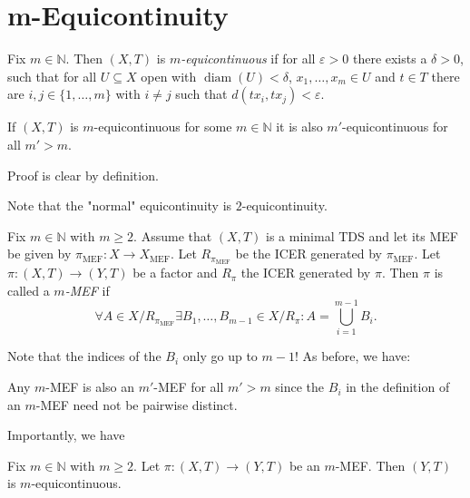 \section{m-Equicontinuity}

\begin{frame}
    \begin{definition}
	    Fix $m \in \mathbb{N}$. Then $(X, T)$ is \emph{$m$-equicontinuous} if for all $\varepsilon > 0$ there exists a $\delta > 0$, such that for all $U \subseteq X$ open with $\operatorname{diam}(U) < \delta$, $x_1, \dots, x_m \in U$ and $t \in T$ there are $i, j \in \{1, \dots, m\}$ with $i \neq j$ such that $d(tx_i, tx_j) < \varepsilon$.
    \end{definition}
    \pause
    \begin{proposition}
	    If $(X, T)$ is $m$-equicontinuous for some $m \in \mathbb{N}$ it is also $m'$-equicontinuous for all $m' > m$.
    \end{proposition}
    Proof is clear by definition.

    Note that the "normal" equicontinuity is $2$-equicontinuity.
\end{frame}

\begin{frame}
    \begin{definition}[$m$-MEF]
        Fix $m \in \mathbb{N}$ with $m \geq 2$. Assume that $(X, T)$ is a minimal TDS and let its MEF be given by $\pi_{\mathrm{MEF}}: X \to X_{\mathrm{MEF}}$.
        Let $R_{\pi_{\mathrm{MEF}}}$ be the ICER generated by $\pi_{\text{MEF}}$. Let $\pi: (X,T) \to (Y,T)$ be a factor and $R_\pi$ the ICER generated by $\pi$.
        Then $\pi$ is called a \emph{$m$-MEF} if
        \begin{equation*}
            \forall A \in X/R_{\pi_{\mathrm{MEF}}} \exists B_1, \dots, B_{m-1} \in X/R_\pi: 
            A = \bigcup_{i=1}^{m-1} B_i.
        \end{equation*}
    \end{definition}
    Note that the indices of the $B_i$ only go up to $m-1$!
    \pause
    As before, we have:
    \begin{remark}
        Any $m$-MEF is also an $m'$-MEF for all $m' > m$
        since the $B_i$ in the definition of an $m$-MEF need not be pairwise distinct.
    \end{remark}
\end{frame}

\begin{frame}
    Importantly, we have
    \begin{proposition}
	    Fix $m \in \mathbb{N}$ with $m \geq 2$. Let $\pi : (X,T) \to (Y, T)$ be an $m$-MEF. Then $(Y, T)$ is $m$-equicontinuous.
    \end{proposition}
\end{frame}

